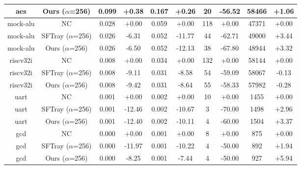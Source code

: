 \begin{table}[t]
{\begin{tabular}{c|c|cc|cc|cc|cc}
aes & Ours  ($\alpha$=256) & 0.099 & +0.38 & 0.167 & +0.26 & 20 & -56.52 & 58466 & +1.06 \\
\hline
mock-alu & NC & 0.028 & +0.00 & 0.059 & +0.00 & 118 & +0.00 & 47371 & +0.00 \\
mock-alu & SFTray  ($\alpha$=256) & 0.026 & -6.31 & 0.052 & -11.77 & 44 & -62.71 & 49000 & +3.44 \\
mock-alu & Ours  ($\alpha$=256) & 0.026 & -6.50 & 0.052 & -12.13 & 38 & -67.80 & 48944 & +3.32 \\
\hline
riscv32i & NC & 0.008 & +0.00 & 0.034 & +0.00 & 132 & +0.00 & 58144 & +0.00 \\
riscv32i & SFTray  ($\alpha$=256) & 0.008 & -9.11 & 0.031 & -8.58 & 54 & -59.09 & 58067 & -0.13 \\
riscv32i & Ours  ($\alpha$=256) & 0.008 & -9.42 & 0.031 & -8.64 & 55 & -58.33 & 57982 & -0.28 \\
\hline
uart & NC & 0.001 & +0.00 & 0.002 & +0.00 & 10 & +0.00 & 1455 & +0.00 \\
uart & SFTray  ($\alpha$=256) & 0.001 & -12.46 & 0.002 & -10.67 & 3 & -70.00 & 1498 & +2.96 \\
uart & Ours  ($\alpha$=256) & 0.001 & -12.40 & 0.002 & -10.11 & 4 & -60.00 & 1504 & +3.37 \\
\hline
gcd & NC & 0.000 & +0.00 & 0.001 & +0.00 & 8 & +0.00 & 875 & +0.00 \\
gcd & SFTray  ($\alpha$=256) & 0.000 & -11.97 & 0.001 & -10.22 & 4 & -50.00 & 892 & +1.94 \\
gcd & Ours  ($\alpha$=256) & 0.000 & -8.25 & 0.001 & -7.44 & 4 & -50.00 & 927 & +5.94 \\
\hline
\end{tabular}
}
\end{table}